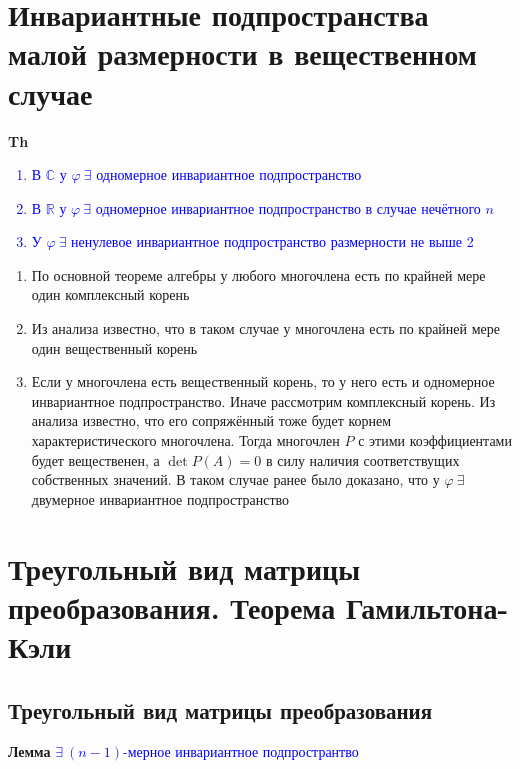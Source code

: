\documentclass[a4paper, 14pt]{article}
\begin{document}
    


    \section{Инвариантные подпространства малой размерности в вещественном случае}

    \textbf{Th} \textcolor{blue}{
        \begin{enumerate}
            \item В $\mathbb{C}$ у $\varphi~\exists$ одномерное инвариантное подпространство
            \item В $\mathbb{R}$ у $\varphi~\exists$ одномерное инвариантное подпространство в случае нечётного $n$
            \item У $\varphi~\exists$ ненулевое инвариантное подпространство размерности не выше 2
        \end{enumerate}             }

    \begin{enumerate}
        \item По основной теореме алгебры у любого многочлена есть по крайней мере один комплексный корень
        \item Из анализа известно, что в таком случае у многочлена есть по крайней мере один вещественный корень
        \item Если у многочлена есть вещественный корень, то у него есть и одномерное инвариантное подпространство.
        Иначе рассмотрим комплексный корень.
        Из анализа известно, что его сопряжённый тоже будет корнем характеристического многочлена.
        Тогда многочлен $P$ с этими коэффициентами будет вещественен, а $\det P(A) = 0$ в силу наличия соответствущих
        собственных значений.
        В таком случае ранее было доказано, что у $\varphi~\exists$ двумерное инвариантное подпространство
    \end{enumerate}

    \section{Треугольный вид матрицы преобразования.
    Теорема Гамильтона-Кэли}

    \subsection{Треугольный вид матрицы преобразования}

    \textbf{Лемма} \textcolor{blue}{$\exists~(n-1)$-мерное инвариантное подпространтво}
\end{document}
